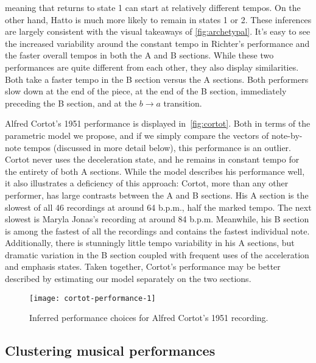 \documentclass[12pt]{article}
\begin{document}
meaning that returns to state 1 can start at relatively different
tempos. On the other hand, Hatto is much more
likely to remain in states 1 or 2. These inferences are largely
consistent with the visual takeaways of \autoref{fig:archetypal}. It's
easy to see the increased variability around the constant tempo in
Richter's performance and the faster overall tempos in both the A and
B sections.
%
While these two performances are quite different from each other, they
also display similarities. Both take a faster tempo in the B
section versus the A sections. Both performers slow down at the end of
the piece, at the end of the B section, immediately preceding the B section, and at the
$b\rightarrow a$ transition.

Alfred Cortot's 1951 performance is displayed
in~\autoref{fig:cortot}. Both in terms of the parametric model we
propose, and if we simply compare the vectors of note-by-note tempos
(discussed in more detail below), this performance is an
outlier. Cortot never uses the deceleration state, and he remains in
constant tempo for the entirety of both A sections. While the model
describes his performance well, it also illustrates a deficiency of
this approach: Cortot, more than any other performer, has large
contrasts between the A and B sections. His A section is the slowest
of all 46 recordings at around 64 b.p.m., half the marked
tempo. The next slowest is Maryla Jonas's recording at around 84
b.p.m. Meanwhile, his B section is among the fastest of all the
recordings and contains the fastest individual note. Additionally,
there is stunningly little tempo variability in his A sections, but
dramatic variation in the B section coupled with frequent uses of the
acceleration and emphasis states. Taken together, Cortot's performance
may be better described by estimating our model separately on the two sections.
\begin{figure}[t]
  \centering
    \texttt{[image: cortot-performance-1]}
  \caption{Inferred performance choices for Alfred Cortot's 1951
    recording.}
  \label{fig:cortot}
\end{figure}



\subsection{Clustering musical performances}
\label{sec:clust-music-perf}
\end{document}
